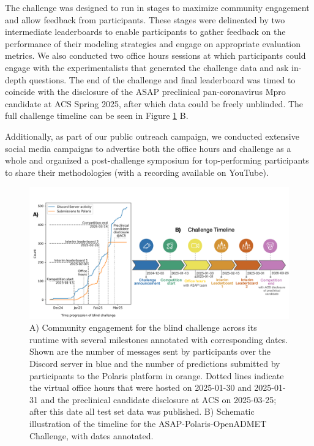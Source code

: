 \documentclass[journal=jcim,manuscript=article]{achemso}
\begin{document}
The challenge was designed to run in stages to maximize community engagement and allow feedback from participants. These stages were delineated by two intermediate leaderboards to enable participants to gather feedback on the performance of their modeling strategies and engage on appropriate evaluation metrics. We also conducted two office hours sessions at which participants could engage with the experimentalists that generated the challenge data and ask in-depth questions. The end of the challenge and final leaderboard was timed to coincide with the disclosure of the ASAP preclinical pan-coronavirus Mpro candidate at ACS Spring 2025\cite{griffen_2025_acs}, after which data could be freely unblinded.  The full challenge timeline can be seen in Figure \ref{fgr:timeline_engagement} B.


Additionally, as part of our public outreach campaign, we conducted extensive social media campaigns to advertise both the office hours and challenge as a whole and organized a post-challenge symposium for top-performing participants to share their methodologies (with a recording available on YouTube). 


\begin{figure}
    \includegraphics[scale=0.58]{02_figs_community/community_progress_and_timeline.png}
  \caption{A) Community engagement for the blind challenge across its runtime with several milestones annotated with corresponding dates. Shown are the number of messages sent by participants over the Discord server in blue and the number of predictions submitted by participants to the Polaris platform in orange. Dotted lines indicate the virtual office hours that were hosted on 2025-01-30 and 2025-01-31 and the preclinical candidate disclosure at ACS on 2025-03-25; after this date all test set data was published. B) Schematic illustration of the timeline for the ASAP-Polaris-OpenADMET Challenge, with dates annotated.}
  \label{fgr:timeline_engagement}
\end{figure}
\end{document}
